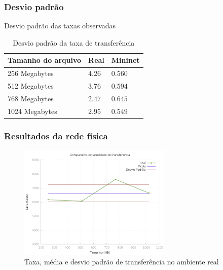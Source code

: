 \documentclass{beamer}
\begin{document}
\begin{frame}
    \frametitle{Desvio padrão}

    Desvio padrão das taxas observadas

    \begin{table}[h]
        \centering
        \begin{tabular}{|l|l|l|}
            \hline
            Tamanho do arquivo & Real         &  Mininet    \\ \hline
            256  Megabytes     & $4.26$       &  $0.560$    \\
            512  Megabytes     & $3.76$       &  $0.594$    \\
            768  Megabytes     & $2.47$       &  $0.645$    \\
            1024 Megabytes     & $2.95$       &  $0.549$    \\ \hline
        \end{tabular}
        \caption{Desvio padrão da taxa de transferência}
        \label{tab_taxa_desvio}
    \end{table}
\end{frame}

\begin{frame}
    \frametitle{Resultados da rede física}

    \begin{figure}[ht]
        \centering
        \includegraphics[width=0.65\textwidth]{data/taxa_real}
        \caption{Taxa, média e desvio padrão de transferência no ambiente real}
        \label{fig:taxa_mininet}
    \end{figure}
\end{frame}
\end{document}
